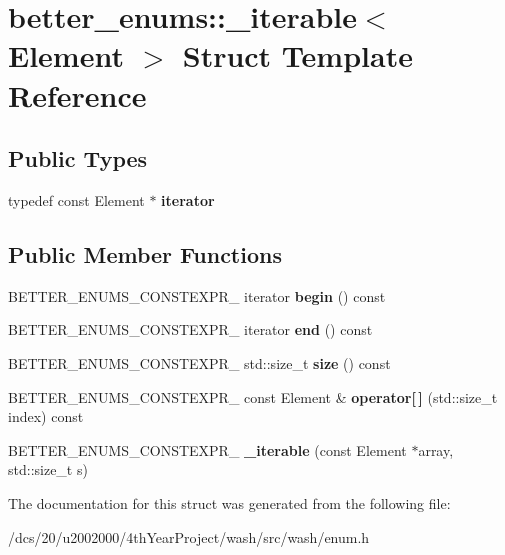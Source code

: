 \hypertarget{structbetter__enums_1_1__iterable}{}\section{better\+\_\+enums\+:\+:\+\_\+iterable$<$ Element $>$ Struct Template Reference}
\label{structbetter__enums_1_1__iterable}
\subsection*{Public Types}
\begin{DoxyCompactItemize}
\item 
\mbox{\label{structbetter__enums_1_1__iterable_aedd0f1a24a5b98d96eb9a689ceb09133}} 
typedef const Element $\ast$ {\bfseries iterator}
\end{DoxyCompactItemize}
\subsection*{Public Member Functions}
\begin{DoxyCompactItemize}
\item 
\mbox{\label{structbetter__enums_1_1__iterable_a33eaf589b35780cb4a494b452dcc1edc}} 
B\+E\+T\+T\+E\+R\+\_\+\+E\+N\+U\+M\+S\+\_\+\+C\+O\+N\+S\+T\+E\+X\+P\+R\+\_\+ iterator {\bfseries begin} () const
\item 
\mbox{\label{structbetter__enums_1_1__iterable_a5ae6805cc8e28ba17c08afd6b5487764}} 
B\+E\+T\+T\+E\+R\+\_\+\+E\+N\+U\+M\+S\+\_\+\+C\+O\+N\+S\+T\+E\+X\+P\+R\+\_\+ iterator {\bfseries end} () const
\item 
\mbox{\label{structbetter__enums_1_1__iterable_ab3877289c28c78e5d16b565b5ee424cd}} 
B\+E\+T\+T\+E\+R\+\_\+\+E\+N\+U\+M\+S\+\_\+\+C\+O\+N\+S\+T\+E\+X\+P\+R\+\_\+ std\+::size\+\_\+t {\bfseries size} () const
\item 
\mbox{\label{structbetter__enums_1_1__iterable_a5c9cd531cdde7a0f0d2b927771bba8c8}} 
B\+E\+T\+T\+E\+R\+\_\+\+E\+N\+U\+M\+S\+\_\+\+C\+O\+N\+S\+T\+E\+X\+P\+R\+\_\+ const Element \& {\bfseries operator\mbox{[}$\,$\mbox{]}} (std\+::size\+\_\+t index) const
\item 
\mbox{\label{structbetter__enums_1_1__iterable_a0c44e8035fbb66814732fb2f8fe2cbdc}} 
B\+E\+T\+T\+E\+R\+\_\+\+E\+N\+U\+M\+S\+\_\+\+C\+O\+N\+S\+T\+E\+X\+P\+R\+\_\+ {\bfseries \+\_\+iterable} (const Element $\ast$array, std\+::size\+\_\+t s)
\end{DoxyCompactItemize}


The documentation for this struct was generated from the following file\+:\begin{DoxyCompactItemize}
\item 
/dcs/20/u2002000/4th\+Year\+Project/wash/src/wash/enum.\+h\end{DoxyCompactItemize}
